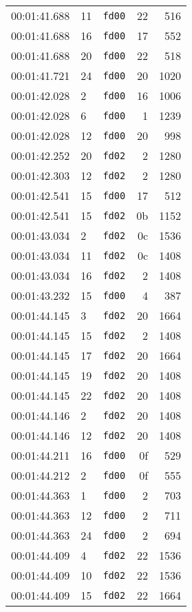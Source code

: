 \documentclass{article}
\begin{document}
\begin{longtable}{lllrr}
00:01:41.688 & 11 & \texttt{fd00} & 22 & 516 \\
00:01:41.688 & 16 & \texttt{fd00} & 17 & 552 \\
00:01:41.688 & 20 & \texttt{fd00} & 22 & 518 \\
00:01:41.721 & 24 & \texttt{fd00} & 20 & 1020 \\
00:01:42.028 & 2 & \texttt{fd00} & 16 & 1006 \\
00:01:42.028 & 6 & \texttt{fd00} & 1 & 1239 \\
00:01:42.028 & 12 & \texttt{fd00} & 20 & 998 \\
00:01:42.252 & 20 & \texttt{fd02} & 2 & 1280 \\
00:01:42.303 & 12 & \texttt{fd02} & 2 & 1280 \\
00:01:42.541 & 15 & \texttt{fd00} & 17 & 512 \\
00:01:42.541 & 15 & \texttt{fd02} & 0b & 1152 \\
00:01:43.034 & 2 & \texttt{fd02} & 0c & 1536 \\
00:01:43.034 & 11 & \texttt{fd02} & 0c & 1408 \\
00:01:43.034 & 16 & \texttt{fd02} & 2 & 1408 \\
00:01:43.232 & 15 & \texttt{fd00} & 4 & 387 \\
00:01:44.145 & 3 & \texttt{fd02} & 20 & 1664 \\
00:01:44.145 & 15 & \texttt{fd02} & 2 & 1408 \\
00:01:44.145 & 17 & \texttt{fd02} & 20 & 1664 \\
00:01:44.145 & 19 & \texttt{fd02} & 20 & 1408 \\
00:01:44.145 & 22 & \texttt{fd02} & 20 & 1408 \\
00:01:44.146 & 2 & \texttt{fd02} & 20 & 1408 \\
00:01:44.146 & 12 & \texttt{fd02} & 20 & 1408 \\
00:01:44.211 & 16 & \texttt{fd00} & 0f & 529 \\
00:01:44.212 & 2 & \texttt{fd00} & 0f & 555 \\
00:01:44.363 & 1 & \texttt{fd00} & 2 & 703 \\
00:01:44.363 & 12 & \texttt{fd00} & 2 & 711 \\
00:01:44.363 & 24 & \texttt{fd00} & 2 & 694 \\
00:01:44.409 & 4 & \texttt{fd02} & 22 & 1536 \\
00:01:44.409 & 10 & \texttt{fd02} & 22 & 1536 \\
00:01:44.409 & 15 & \texttt{fd02} & 22 & 1664 \\

\end{longtable}
\end{document}
